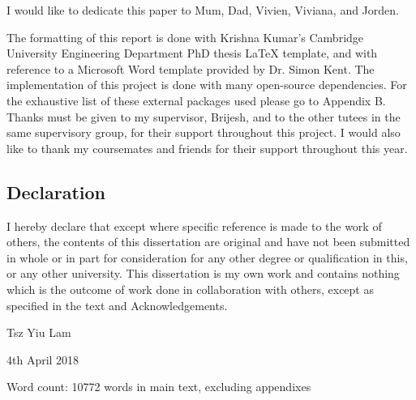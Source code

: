 
\begin{acknowledgements}      

\begin{center}
I would like to dedicate this paper to Mum, Dad, Vivien, Viviana, and Jorden.\\
\end{center}

The formatting of this report is done with Krishna Kumar's Cambridge University Engineering Department PhD thesis 
LaTeX template, and with reference to a Microsoft Word template provided by Dr. Simon Kent. 
The implementation of this project is done with many open-source dependencies.
For the exhaustive list of these external packages used please go to Appendix B.\\

Thanks must be given to my supervisor, Brijesh, and to the other tutees in the same supervisory group, 
for their support throughout this project. I would also like to thank my coursemates and friends for their 
support throughout this year.\\

\begin{center}
\section*{Declaration}
\end{center}
\vspace{1cm}
I hereby declare that except where specific reference is made to the work of 
others, the contents of this dissertation are original and have not been 
submitted in whole or in part for consideration for any other degree or 
qualification in this, or any other university. This dissertation is my own 
work and contains nothing which is the outcome of work done in collaboration 
with others, except as specified in the text and Acknowledgements.

\begin{flushright}
Tsz Yiu Lam

4th April 2018
\end{flushright}
\vspace{1cm}
\begin{center}
Word count: 10772 words in main text, excluding appendixes
\end{center}
\end{acknowledgements}
